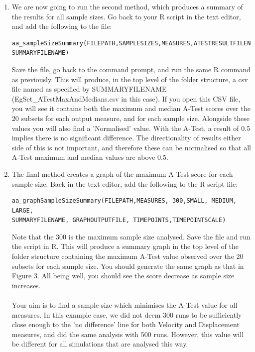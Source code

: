 \documentclass[a4paper,11pt]{article}
\begin{document}
\begin{enumerate}
\item We are now going to run the second method, which produces a summary of the results for all sample sizes.  Go back to your R script in the text editor, and add the following to the file:

\begin{verbatim}
aa_sampleSizeSummary(FILEPATH,SAMPLESIZES,MEASURES,ATESTRESULTFILENAME,
SUMMARYFILENAME)
\end{verbatim}

Save the file, go back to the command prompt, and run the same R command as previously.  This will produce, in the top level of the folder structure, a csv file named as specified by SUMMARYFILENAME  (EgSet\_ATestMaxAndMedians.csv in this case).  If you open this CSV file, you will see it contains both the maximum and median A-Test scores over the 20 subsets for each output measure, and for each sample size.  Alongside these values you will also find a 'Normalised' value.  With the A-Test, a result of 0.5 implies there is no significant difference.  The directionality of results either side of this is not important, and therefore these can be normalised so that all A-Test maximum and median values are above 0.5.

\item The final method creates a graph of the maximum A-Test score for each sample size.  Back in the text editor, add the following to the R script file:

\begin{verbatim}
aa_graphSampleSizeSummary(FILEPATH,MEASURES, 300,SMALL, MEDIUM, LARGE, 
SUMMARYFILENAME, GRAPHOUTPUTFILE, TIMEPOINTS,TIMEPOINTSCALE)
\end{verbatim}

Note that the 300 is the maximum sample size analysed.  Save the file and run the script in R.  This will produce a summary graph in the top level of the folder structure containing the maximum A-Test value observed over the 20 subsets for each sample size. You should generate the same graph as that in Figure 3. All being well, you should see the score decrease as sample size increases.  \\
\\
Your aim is to find a sample size which minimises the A-Test value for all measures.  In this example case, we did not deem 300 runs to be sufficiently close enough to the 'no difference' line for both Velocity and Displacement measures, and did the same analysis with 500 runs.  However, this value will be different for all simulations that are analysed this way.

\end{enumerate}
\end{document}
